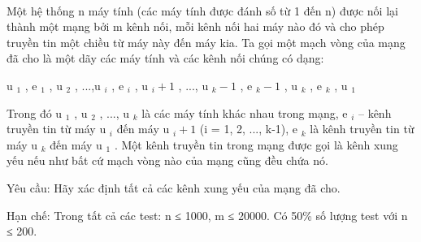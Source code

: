  

Một hệ thống n máy tính (các máy tính được đánh số từ 1 đến n) được nối lại thành một mạng bởi m kênh nối, mỗi kênh nối hai máy nào đó và cho phép truyền tin một chiều từ máy này đến máy kia. Ta gọi một mạch vòng của mạng đã cho là một dãy các máy tính và các kênh nối chúng có dạng:

u $_ 1 $ , e $_ 1 $ , u $_ 2 $ , ...,u $_ i $ , e $_ i $ , u $_ i+1 $ , ..., u $_ k-1 $ , e $_ k-1 $ , u $_ k $ , e $_ k $ , u $_ 1 $

Trong đó u $_ 1 $ , u $_ 2 $ , ..., u $_ k $ là các máy tính khác nhau trong mạng, e $_ i $ – kênh truyền tin từ máy u $_ i $ đến máy u $_ i+1 $ (i = 1, 2, ..., k-1), e $_ k $ là kênh truyền tin từ máy u $_ k $ đến máy u $_ 1 $ . Một kênh truyền tin trong mạng được gọi là kênh xung yếu nếu như bất cứ mạch vòng nào của mạng cũng đều chứa nó.

Yêu cầu: Hãy xác định tất cả các kênh xung yếu của mạng đã cho.

Hạn chế:
Trong tất cả các test: n ≤ 1000, m ≤ 20000. Có 50\% số lượng test với n ≤ 200.